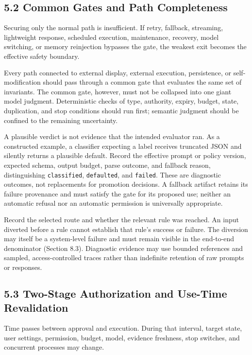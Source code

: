 \subsection{5.2 Common Gates and Path Completeness}\label{common-gates-and-path-completeness}

Securing only the normal path is insufficient. If retry, fallback, streaming, lightweight response, scheduled execution, maintenance, recovery, model switching, or memory reinjection bypasses the gate, the weakest exit becomes the effective safety boundary.

Every path connected to external display, external execution, persistence, or self-modification should pass through a common gate that evaluates the same set of invariants. The common gate, however, must not be collapsed into one giant model judgment. Deterministic checks of type, authority, expiry, budget, state, duplication, and stop conditions should run first; semantic judgment should be confined to the remaining uncertainty.

A plausible verdict is not evidence that the intended evaluator ran. As a constructed example, a classifier expecting a label receives truncated JSON and silently returns a plausible default. Record the effective prompt or policy version, expected schema, output budget, parse outcome, and fallback reason, distinguishing \passthrough{\lstinline!classified!}, \passthrough{\lstinline!defaulted!}, and \passthrough{\lstinline!failed!}. These are diagnostic outcomes, not replacements for promotion decisions. A fallback artifact retains its failure provenance and must satisfy the gate for its proposed use; neither an automatic refusal nor an automatic permission is universally appropriate.

Record the selected route and whether the relevant rule was reached. An input diverted before a rule cannot establish that rule's success or failure. The diversion may itself be a system-level failure and must remain visible in the end-to-end denominator (Section 8.3). Diagnostic evidence may use bounded references and sampled, access-controlled traces rather than indefinite retention of raw prompts or responses.

\subsection{5.3 Two-Stage Authorization and Use-Time Revalidation}\label{two-stage-authorization-and-use-time-revalidation}

Time passes between approval and execution. During that interval, target state, user settings, permission, budget, model, evidence freshness, stop switches, and concurrent processes may change.

